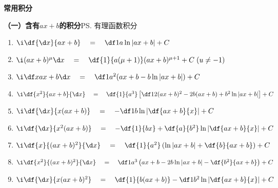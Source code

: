
\begin{center}
	{\bf\Large 常\quad 用\quad 积\quad 分}\\[2ex]
\end{center}

{\bf （一）含有$ax+b$的积分}\ps{有理函数积分}
\begin{enumerate}
  \setlength{\itemindent}{1cm}
  \item $\i\df{\d x}{ax+b}\quad=\quad \df 1a\ln|ax+b|+C$ 
  \item $\i(ax+b)^{\mu}{\d x}\quad=\quad \df{1}{a(\mu+1)}(ax+b)^{\mu+1}+C\;(u\ne
  -1)$
  \item $\i\df x{ax+b}{\d x}\quad=\quad \df 1{a^2}(ax+b-b\ln|ax+b|)+C$
  \item $\i\df{x^2}{ax+b}{\d x} \quad=\quad 
  \df{1}{a^3}\left[\df 12(ax+b)^2-2b(ax+b)+b^2\ln|ax+b|\right]+C$
  \item $\i\df{{\d x}}{x(ax+b)} \quad=\quad -\df 1b\ln\left|\df{ax+b}{x}\right|+C$
  \item
  $\i\df{{\d x}}{x^2(ax+b)} \quad=\quad -\df{1}{bx}+\df{a}{b^2}\ln\left|\df{ax+b}{x}\right|+C$
  \item $\i\df{x}{(ax+b)^2}{\d x}  \quad=\quad
  \df{1}{a^2}\left(\ln|ax+b|+\df{b}{ax+b}\right)+C$
  \item $\i\df{x^2}{(ax+b)^2}{\d x} \quad=\quad \df 1{a^3}\left(
  ax+b-2b\ln|ax+b|-\df{b^2}{ax+b}\right)+C$
  \item $\i\df{{\d x}}{x(ax+b)^2} \quad=\quad \df{1}{b(ax+b)}-\df 1{b^2}\ln\left|
  \df{ax+b}{x}\right|+C $


\end{enumerate}
